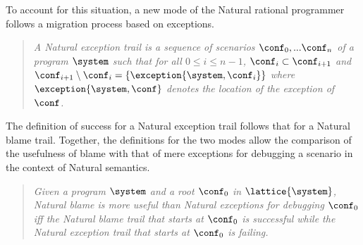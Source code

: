 To account for this situation, a new mode of the Natural rational
programmer follows a migration process based on exceptions.
\begin{quote}
\it A {\em Natural exception trail\/} is a sequence of scenarios $\conf_0,...\conf_n$ of a
program $\system$ such that for all $0 \leq i \leq n - 1$, $\conf_i \subset
\conf_{i+1}$ and $\conf_{i+1} \setminus \conf_i = \{\exception{\system, \conf_i}\}$
where $\exception{\system, \conf}$ denotes the location of the exception of $\conf$.
\end{quote}

The definition of success for a Natural exception trail follows that for
a Natural blame trail.
Together, the definitions for the two modes allow the comparison of the usefulness of blame 
with that of mere exceptions for debugging a scenario in the context of Natural semantics.
\begin{quote}
\it 
  Given a program $\system$ and a root $\conf_0$ in $\lattice{\system}$,
  Natural blame is \emph{more useful} than Natural exceptions for
  debugging $\conf_0$ iff 
  the Natural blame trail 
  that starts at $\conf_0$ is successful while the Natural exception trail that
  starts at $\conf_0$ is failing.
\end{quote}
